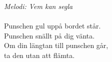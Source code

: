{\footnotesize\textit{Melodi: Vem kan segla}}\\
\\
Punschen gul uppå bordet står.\\
Punschen snällt på dig vänta.\\
Om din längtan till punschen går,\\
ta den utan att flämta.
